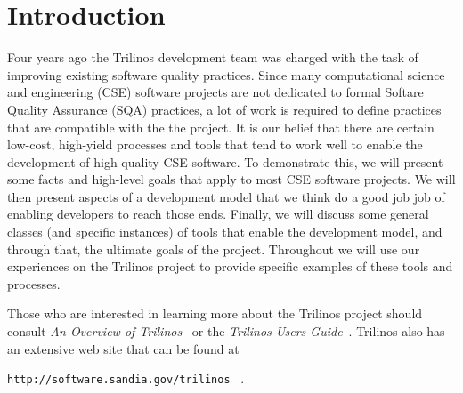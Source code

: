 \documentclass[12pt,relax]{article}
\newcommand{\InlineDirectory}[1]{
  {\hspace{0.01 in}} {\tt #1} {\hspace{0.01 in}}}
\begin{document}
\clearpage
\tableofcontents

\clearpage


\section{Introduction}
\label{Section:Introduction}


Four years ago the Trilinos development team was charged with the task of 
improving existing software quality practices.  Since many computational 
science and engineering (CSE) software projects are not dedicated to formal
Softare Quality Assurance (SQA) practices, a lot of work is required to 
define practices that are compatible with the the project.
It is our belief that 
there are certain low-cost, high-yield processes and tools that tend to work 
well to enable the development of high quality CSE software.  To demonstrate 
this, we will present some facts and high-level goals that apply to most CSE 
software projects.  We will then present aspects of
a development model that we think do a good job job of enabling developers to
reach those ends.  Finally, we will discuss some general classes (and specific
instances) of tools that enable the development model, and through that, 
the ultimate goals of the project.  Throughout we will use our experiences on 
the Trilinos project to provide specific examples of these tools and processes.

Those who are interested in learning more about the Trilinos project should
consult {\it An Overview of Trilinos}~\cite{Trilinos-Overview} or the
{\it Trilinos Users Guide}~\cite{Trilinos-Users-Guide}.  Trilinos also has an
extensive web site that can be found at \newline
\InlineDirectory{http://software.sandia.gov/trilinos}~\cite{Trilinos-home-page}.
\end{document}

